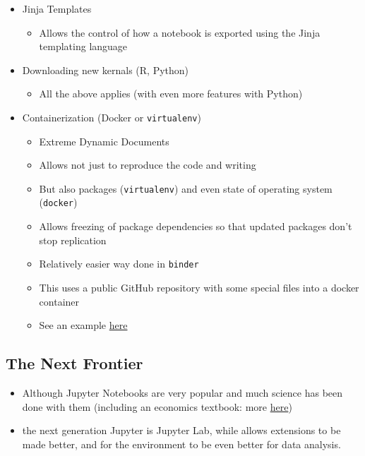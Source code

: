 \documentclass[10pt,parskip=half,
	toc=sectionentrywithdots,
	bibliography=totocnumbered,
	captions=tableheading,numbers=noendperiod]{scrartcl}
\providecommand{\tightlist}{%
  \setlength{\itemsep}{0pt}\setlength{\parskip}{0pt}}
\begin{document}
\begin{itemize}
\tightlist
\item
  Jinja Templates

  \begin{itemize}
  \tightlist
  \item
    Allows the control of how a notebook is exported using the Jinja
    templating language
  \end{itemize}
\item
  Downloading new kernals (R, Python)

  \begin{itemize}
  \tightlist
  \item
    All the above applies (with even more features with Python)
  \end{itemize}
\item
  Containerization (Docker or \texttt{virtualenv})

  \begin{itemize}
  \tightlist
  \item
    Extreme Dynamic Documents
  \item
    Allows not just to reproduce the code and writing
  \item
    But also packages (\texttt{virtualenv}) and even state of operating
    system (\texttt{docker})
  \item
    Allows freezing of package dependencies so that updated packages
    don't stop replication
  \item
    Relatively easier way done in \texttt{binder}
  \item
    This uses a public GitHub repository with some special files into a
    docker container
  \item
    See an example
    \href{https://mybinder.org/v2/gh/wildtreetech/explore-open-data/binder20-elife?filepath=bikes-per-week.ipynb}{here}
  \end{itemize}
\end{itemize}

\hypertarget{the-next-frontier}{%
\subsection{The Next Frontier}\label{the-next-frontier}}

\begin{itemize}
\tightlist
\item
  Although Jupyter Notebooks are very popular and much science has been
  done with them (including an economics textbook: more
  \href{https://quantecon.org}{here})
\item
  the next generation Jupyter is Jupyter Lab, while allows extensions to
  be made better, and for the environment to be even better for data
  analysis.
\end{itemize}

	
\end{document}
